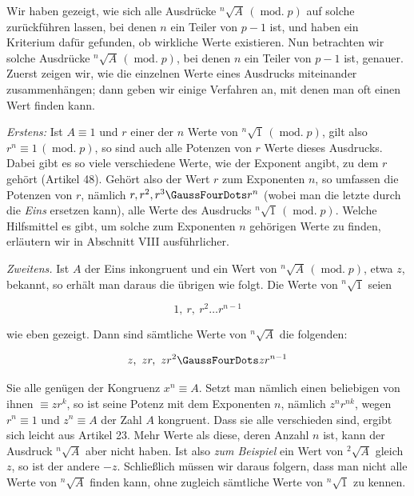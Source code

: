 Wir haben gezeigt, wie sich alle Ausdrücke ${}^{n}\!\surd {A}\,(\operatorname{mod.}p)$ auf solche zurückführen lassen, bei denen $n$ ein Teiler von $p-1$ ist, und haben ein Kriterium dafür gefunden, ob wirkliche Werte existieren. Nun betrachten wir solche Ausdrücke ${}^{n}\!\surd {A}\,(\operatorname{mod.}p)$, bei denen $n$ ein Teiler von $p-1$ ist, genauer. Zuerst zeigen wir, wie die einzelnen Werte eines Ausdrucks miteinander zusammenhängen; dann geben wir einige Verfahren an, mit denen man oft einen Wert finden kann.

\emph{Erstens:} Ist $A\equiv1$ und $r$ einer der $n$ Werte von ${}^{n}\!\surd {1}\,(\operatorname{mod.}p)$, gilt also $r^n\equiv1\,(\operatorname{mod.}p)$, so sind auch alle Potenzen von $r$ Werte dieses Ausdrucks. Dabei gibt es so viele verschiedene Werte, wie der Exponent angibt, zu dem $r$ gehört (Artikel 48). Gehört also der Wert $r$ zum Exponenten $n$, so umfassen die Potenzen von $r$, nämlich $r,r^2,r^3\GaussFourDots r^n$ (wobei man die letzte durch die \emph{Eins} ersetzen kann), alle Werte des Ausdrucks ${}^{n}\!\surd {1}\,(\operatorname{mod.}p)$. Welche Hilfsmittel es gibt, um solche zum Exponenten $n$ gehörigen Werte zu finden, erläutern wir in Abschnitt VIII ausführlicher.

\emph{Zweitens.} Ist $A$ der Eins inkongruent und ein Wert von ${}^{n}\!\surd {A}\,(\operatorname{mod.}p)$, etwa $z$, bekannt, so erhält man daraus die übrigen wie folgt. Die Werte von ${}^{n}\!\surd {1}$ seien

\[1,\ r,\ r^2\ldots r^{n-1}\]

wie eben gezeigt. Dann sind sämtliche Werte von ${}^{n}\!\surd {A}$ die folgenden:

\[z,\ zr,\ zr^2\GaussFourDots zr^{n-1}\]

Sie alle genügen der Kongruenz $x^n\equiv A$. Setzt man nämlich einen beliebigen von ihnen $\equiv zr^k$, so ist seine Potenz mit dem Exponenten $n$, nämlich $z^n r^{nk}$, wegen $r^n\equiv1$ und $z^n\equiv A$ der Zahl $A$ kongruent. Dass sie alle verschieden sind, ergibt sich leicht aus Artikel 23. Mehr Werte als diese, deren Anzahl $n$ ist, kann der Ausdruck ${}^{n}\!\surd {A}$ aber nicht haben. Ist also \emph{zum Beispiel} ein Wert von ${}^{2}\!\surd {A}$ gleich $z$, so ist der andere $-z$. Schließlich
müssen wir daraus folgern, dass man nicht alle Werte von ${}^{n}\!\surd {A}$ finden kann, ohne zugleich sämtliche Werte von ${}^{n}\!\surd {1}$ zu kennen.

